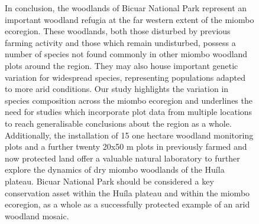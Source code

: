 \documentclass[diversity,article,submit,moreauthors,pdftex]{Definitions/mdpi}
\begin{document}
\begin{figure}[H]
In conclusion, the woodlands of Bicuar National Park represent an important woodland refugia at the far western extent of the miombo ecoregion. These woodlands, both those disturbed by previous farming activity and those which remain undisturbed, possess a number of species not found commonly in other miombo woodland plots around the region. They may also house important genetic variation for widespread species, representing populations adapted to more arid conditions. Our study highlights the variation in species composition across the miombo ecoregion and underlines the need for studies which incorporate plot data from multiple locations to reach generalisable conclusions about the region as a whole. Additionally, the installation of 15 one hectare woodland monitoring plots and a further twenty 20x50 m plots in previously farmed and now protected land offer a valuable natural laboratory to further explore the dynamics of dry miombo woodlands of the Hu\'{i}la plateau. Bicuar National Park should be considered a key conservation asset within the Hu\'{i}la plateau and within the miombo ecoregion, as a whole as a successfully protected example of an arid woodland mosaic.




\vspace{6pt} 




\end{figure}
\end{document}
